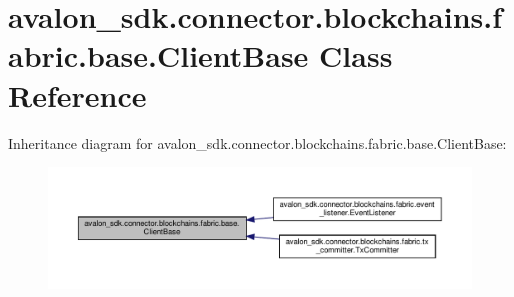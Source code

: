 \hypertarget{classavalon__sdk_1_1connector_1_1blockchains_1_1fabric_1_1base_1_1ClientBase}{}\section{avalon\+\_\+sdk.\+connector.\+blockchains.\+fabric.\+base.\+Client\+Base Class Reference}
\label{classavalon__sdk_1_1connector_1_1blockchains_1_1fabric_1_1base_1_1ClientBase}


Inheritance diagram for avalon\+\_\+sdk.\+connector.\+blockchains.\+fabric.\+base.\+Client\+Base\+:
\nopagebreak
\begin{figure}[H]
\begin{center}
\leavevmode
\includegraphics[width=350pt]{classavalon__sdk_1_1connector_1_1blockchains_1_1fabric_1_1base_1_1ClientBase__inherit__graph}
\end{center}
\end{figure}
